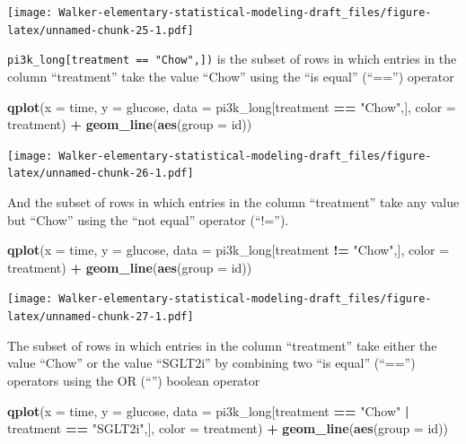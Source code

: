 \documentclass[]{book}
\newenvironment{Shaded}{\begin{snugshade}}{\end{snugshade}}
\newcommand{\DataTypeTok}[1]{\textcolor[rgb]{0.13,0.29,0.53}{#1}}
\newcommand{\KeywordTok}[1]{\textcolor[rgb]{0.13,0.29,0.53}{\textbf{#1}}}
\newcommand{\NormalTok}[1]{#1}
\newcommand{\OperatorTok}[1]{\textcolor[rgb]{0.81,0.36,0.00}{\textbf{#1}}}
\newcommand{\StringTok}[1]{\textcolor[rgb]{0.31,0.60,0.02}{#1}}
\begin{document}
\texttt{[image: Walker-elementary-statistical-modeling-draft\_files/figure-latex/unnamed-chunk-25-1.pdf]}

\texttt{pi3k\_long{[}treatment\ ==\ "Chow",{]})} is the subset of rows in which entries in the column ``treatment'' take the value ``Chow'' using the ``is equal'' (``=='') operator

\begin{Shaded}
\begin{Highlighting}[]
\KeywordTok{qplot}\NormalTok{(}\DataTypeTok{x =}\NormalTok{ time,}
      \DataTypeTok{y =}\NormalTok{ glucose,}
      \DataTypeTok{data =}\NormalTok{ pi3k_long[treatment }\OperatorTok{==}\StringTok{ "Chow"}\NormalTok{,],}
      \DataTypeTok{color =}\NormalTok{ treatment) }\OperatorTok{+}
\StringTok{  }\KeywordTok{geom_line}\NormalTok{(}\KeywordTok{aes}\NormalTok{(}\DataTypeTok{group =}\NormalTok{ id))}
\end{Highlighting}
\end{Shaded}

\texttt{[image: Walker-elementary-statistical-modeling-draft\_files/figure-latex/unnamed-chunk-26-1.pdf]}

And the subset of rows in which entries in the column ``treatment'' take any value but ``Chow'' using the ``not equal'' operator (``!='').

\begin{Shaded}
\begin{Highlighting}[]
\KeywordTok{qplot}\NormalTok{(}\DataTypeTok{x =}\NormalTok{ time,}
      \DataTypeTok{y =}\NormalTok{ glucose,}
      \DataTypeTok{data =}\NormalTok{ pi3k_long[treatment }\OperatorTok{!=}\StringTok{ "Chow"}\NormalTok{,],}
      \DataTypeTok{color =}\NormalTok{ treatment) }\OperatorTok{+}
\StringTok{  }\KeywordTok{geom_line}\NormalTok{(}\KeywordTok{aes}\NormalTok{(}\DataTypeTok{group =}\NormalTok{ id))}
\end{Highlighting}
\end{Shaded}

\texttt{[image: Walker-elementary-statistical-modeling-draft\_files/figure-latex/unnamed-chunk-27-1.pdf]}

The subset of rows in which entries in the column ``treatment'' take either the value ``Chow'' or the value ``SGLT2i'' by combining two ``is equal'' (``=='') operators using the OR (``\textbar{}'') boolean operator

\begin{Shaded}
\begin{Highlighting}[]
\KeywordTok{qplot}\NormalTok{(}\DataTypeTok{x =}\NormalTok{ time,}
      \DataTypeTok{y =}\NormalTok{ glucose,}
      \DataTypeTok{data =}\NormalTok{ pi3k_long[treatment }\OperatorTok{==}\StringTok{ "Chow"} \OperatorTok{|}\StringTok{ }\NormalTok{treatment }\OperatorTok{==}\StringTok{ "SGLT2i"}\NormalTok{,],}
      \DataTypeTok{color =}\NormalTok{ treatment) }\OperatorTok{+}
\StringTok{  }\KeywordTok{geom_line}\NormalTok{(}\KeywordTok{aes}\NormalTok{(}\DataTypeTok{group =}\NormalTok{ id))}
\end{Highlighting}
\end{Shaded}
\end{document}
